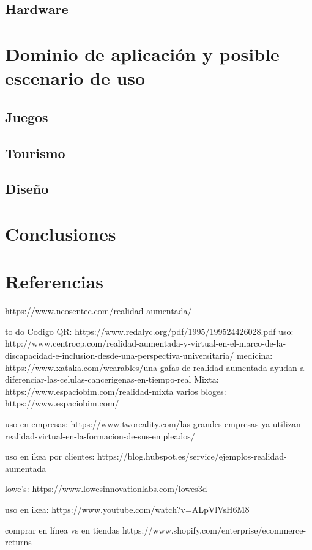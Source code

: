 \documentclass[a4paper,11pt]{scrartcl}
\begin{document}
\subsection{Hardware}
\section{Dominio de aplicación y posible escenario de uso}

\subsection{Juegos}
\subsection{Tourismo}
\subsection{Diseño}

\section{Conclusiones}

\section{Referencias}
\printbibliography

https://www.neosentec.com/realidad-aumentada/


to do
Codigo QR:
https://www.redalyc.org/pdf/1995/199524426028.pdf
uso:
http://www.centrocp.com/realidad-aumentada-y-virtual-en-el-marco-de-la-discapacidad-e-inclusion-desde-una-perspectiva-universitaria/
medicina:
https://www.xataka.com/wearables/una-gafas-de-realidad-aumentada-ayudan-a-diferenciar-las-celulas-cancerigenas-en-tiempo-real
Mixta:
https://www.espaciobim.com/realidad-mixta
varios bloges:
https://www.espaciobim.com/

uso en empresas:
https://www.tworeality.com/las-grandes-empresas-ya-utilizan-realidad-virtual-en-la-formacion-de-sus-empleados/

uso en ikea por clientes:
https://blog.hubspot.es/service/ejemplos-realidad-aumentada

lowe's:
https://www.lowesinnovationlabs.com/lowes3d

uso en ikea:
https://www.youtube.com/watch?v=ALpVlVsH6M8

comprar en línea vs en tiendas
https://www.shopify.com/enterprise/ecommerce-returns
\end{document}

